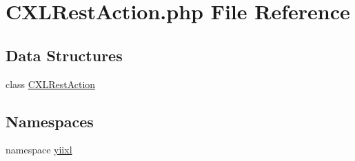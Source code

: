 \hypertarget{CXLRestAction_8php}{
\section{CXLRestAction.php File Reference}
\label{CXLRestAction_8php}
}
\subsection*{Data Structures}
\begin{DoxyCompactItemize}
\item 
class \hyperlink{classCXLRestAction}{CXLRestAction}
\end{DoxyCompactItemize}
\subsection*{Namespaces}
\begin{DoxyCompactItemize}
\item 
namespace \hyperlink{namespaceyiixl}{yiixl}
\end{DoxyCompactItemize}
